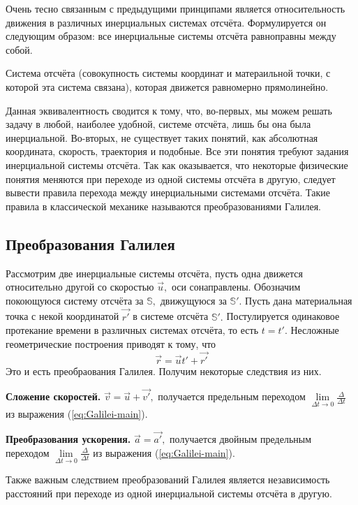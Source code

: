 Очень тесно связанным с предыдущими принципами является относительность движения в различных
инерциальных системах отсчёта. Формулируется он следующим образом: все инерциальные системы отсчёта
равноправны между собой.
\begin{definition}
Система отсчёта (совокупность системы координат и матераильной точки, с которой эта система связана),
которая движется равномерно прямолинейно.
\end{definition}
Данная эквивалентность сводится к тому, что, во-первых, мы можем решать задачу в любой, наиболее удобной,
системе отсчёта, лишь бы она была инерциальной. Во-вторых, не существует таких понятий, как абсолютная
координата, скорость, траектория и подобные. Все эти понятия требуют задания инерциальной системы отсчёта.
Так как оказывается, что некоторые физические понятия меняются при переходе из одной системы отсчёта в другую,
следует вывести правила перехода между инерциальными системами отсчёта. Такие правила в классической механике называются
преобразованиями Галилея.
\subsection{Преобразования Галилея}
Рассмотрим две инерциальные системы отсчёта, пусть одна движется относительно
другой со скоростью $\vec{u},$ оси сонаправлены. Обозначим покоющуюся систему отсчёта
за $\mathbb{S},$ движущуюся за $\mathbb{S'}.$ Пусть дана материальная точка с некой
координатой $\vec{r'}$  в системе отсчёта $\mathbb{S'}.$
Постулируется одинаковое протекание времени в различных системах отсчёта, то есть
$t = t'.$ Несложные геометрические построения приводят к тому, что
\begin{equation}
\vec{r} = \vec{u} t' + \vec{r'}
\label{eq:Galilei-main}
\end{equation}
Это и есть преобраования Галилея. Получим некоторые следствия из них.\par
\textbf{Сложение скоростей.} $\vec{v} = \vec{u} + \vec{v'},$ получается
предельным переходом 
$\lim\limits_{\Delta t \to 0}\frac{\Delta}{\Delta t}$
из выражения (\ref{eq:Galilei-main}).\par
\textbf{Преобразования ускорения.} $\vec{a} = \vec{a'},$ получается
двойным предельным переходом 
$\lim\limits_{\Delta t \to 0}\frac{\Delta}{\Delta t}$
из выражения (\ref{eq:Galilei-main}).\par
Также важным следствием преобразований Галилея является независимость расстояний
при переходе из одной инерциальной системы отсчёта в другую.

